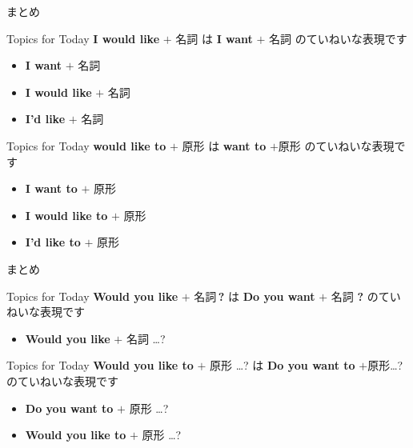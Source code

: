 \documentclass[aspectratio=169,xcolor={dvipsnames,table}]{beamer}
\begin{document}
\begin{frame}[plain]{まとめ}
 \begin{block}{Topics for Today}\small
\textbf{I would like} $+$ 名詞\,\,は\,\,\textbf{I want} $+$ 名詞\,\,のていねいな表現です
\begin{itemize}[square]\small
 \item \textbf{I want} $+$ 名詞
 \item \textbf{I would like} $+$ 名詞
 \item \textbf{I'd like} $+$ 名詞
       \end{itemize}
\end{block}

\begin{block}{Topics for Today}\small
\textbf{would like to} $+$ 原形\,\,は\,\,\textbf{want to} $+$原形\,\,のていねいな表現です
\begin{itemize}[square]\small
 \item \textbf{I want to} $+$ 原形
 \item \textbf{I would like to} $+$ 原形
 \item \textbf{I'd like to} $+$ 原形
       \end{itemize}
\end{block}
\end{frame}
\begin{frame}[plain]{まとめ}
\begin{block}{Topics for Today}\small
\textbf{Would you like} $+$ 名詞\,\textbf{?}\,\,は\,\,\textbf{Do you want} $+$ 名詞\,\,\textbf{?}\,\,のていねいな表現です
\begin{itemize}[square]\small
 \item \textbf{Would you like} $+$ 名詞 \ldots ?
       \end{itemize}
\end{block}

\begin{block}{Topics for Today}\small
\textbf{Would you like to} $+$ 原形 \ldots ?\,\,は\,\,\textbf{Do you want to} $+$原形\ldots ?\,\,のていねいな表現です
\begin{itemize}[square]\small
 \item \textbf{Do you want to} $+$ 原形 \ldots ?
 \item \textbf{Would you like to} $+$ 原形 \ldots ?
       \end{itemize}
\end{block}
\end{frame}
\end{document}
